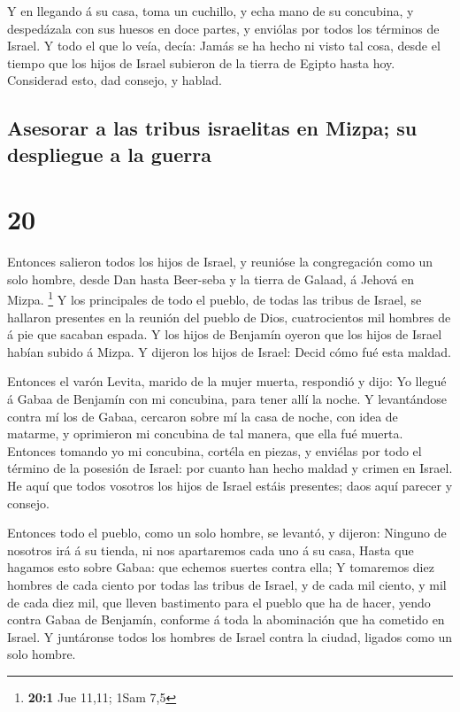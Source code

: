 Y en llegando á su casa, toma un cuchillo, y echa mano de
su concubina, y despedázala con sus huesos en doce partes, y enviólas
por todos los términos de Israel.  Y todo el que lo veía,
decía: Jamás se ha hecho ni visto tal cosa, desde el tiempo que los
hijos de Israel subieron de la tierra de Egipto hasta hoy. Considerad
esto, dad consejo, y hablad.

\hypertarget{asesorar-a-las-tribus-israelitas-en-mizpa-su-despliegue-a-la-guerra}{%
\subsection{Asesorar a las tribus israelitas en Mizpa; su despliegue a
la
guerra}\label{asesorar-a-las-tribus-israelitas-en-mizpa-su-despliegue-a-la-guerra}}

\hypertarget{section-19}{%
\section{20}\label{section-19}}

 Entonces salieron todos los hijos de Israel, y reunióse la
congregación como un solo hombre, desde Dan hasta Beer-seba y la tierra
de Galaad, á Jehová en Mizpa. \footnote{\textbf{20:1} Jue 11,11; 1Sam
  7,5}  Y los principales de todo el pueblo, de todas las
tribus de Israel, se hallaron presentes en la reunión del pueblo de
Dios, cuatrocientos mil hombres de á pie que sacaban espada.
 Y los hijos de Benjamín oyeron que los hijos de Israel
habían subido á Mizpa. Y dijeron los hijos de Israel: Decid cómo fué
esta maldad.

 Entonces el varón Levita, marido de la mujer muerta,
respondió y dijo: Yo llegué á Gabaa de Benjamín con mi concubina, para
tener allí la noche.  Y levantándose contra mí los de Gabaa,
cercaron sobre mí la casa de noche, con idea de matarme, y oprimieron mi
concubina de tal manera, que ella fué muerta.  Entonces
tomando yo mi concubina, cortéla en piezas, y enviélas por todo el
término de la posesión de Israel: por cuanto han hecho maldad y crimen
en Israel.  He aquí que todos vosotros los hijos de Israel
estáis presentes; daos aquí parecer y consejo.

 Entonces todo el pueblo, como un solo hombre, se levantó, y
dijeron: Ninguno de nosotros irá á su tienda, ni nos apartaremos cada
uno á su casa,  Hasta que hagamos esto sobre Gabaa: que
echemos suertes contra ella;  Y tomaremos diez hombres de
cada ciento por todas las tribus de Israel, y de cada mil ciento, y mil
de cada diez mil, que lleven bastimento para el pueblo que ha de hacer,
yendo contra Gabaa de Benjamín, conforme á toda la abominación que ha
cometido en Israel.  Y juntáronse todos los hombres de
Israel contra la ciudad, ligados como un solo hombre.

